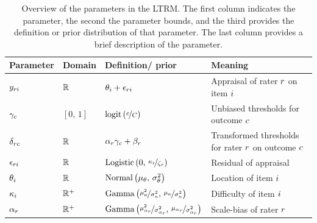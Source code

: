 \documentclass[a4paper,usenames,dvipsnames]{article}
\newenvironment{revision}{\color{teal}}{\color{black}}
\begin{document}
\begin{revision}

	\begin{table}[!ht]

	\centering
	\caption{\begin{revision}Overview of the parameters in the LTRM. The first column indicates the parameter, the second the parameter bounds, and the third provides the definition or prior distribution of that parameter. The last column provides a brief description of the parameter.\end{revision}}%

	\label{tb:LTRMparameterOverview}

	\begin{tabular}{llll}

	\toprule

	Parameter & Domain & Definition/ prior & Meaning\\

	\midrule

	$y_{ri}		$&$	\mathbb{R}			$&$\theta_i + \epsilon_{ri}$&
	\makecell[l]{Appraisal of rater $r$\\on item $i$}\\

	$\gamma_c 		$&$	[0,\,1]			$&$\logit{\nicefrac{\Incat}{\Tncat}}$&
	\makecell[l]{Unbiased thresholds for\\outcome $c$}\\

	$\delta_{rc} 	$&$	\mathbb{R}			$&$\alpha_r \gamma_c + \beta_r$&
	\makecell[l]{Transformed thresholds\\for rater $r$ on outcome $c$}\\

	$\epsilon_{ri}   		$&$	\mathbb{R}			$&$\text{Logistic}\left(0,\,\nicefrac{\kappa_i}{\zeta_r}\right) $&
	Residual of appraisal\\

	$\theta_i        		$&$	\mathbb{R}			$&$\text{Normal}\left(\mu_\theta,\,\sigma_\theta^2\right)$&
	Location of item $i$\\

	$\kappa_i   		$&$	\mathbb{R}^+	$&$\text{Gamma}\left(\nicefrac{\mu_\kappa^2}{\sigma_\kappa^2},\,\nicefrac{\mu_\kappa}{\sigma_\kappa^2}\right) $&
	Difficulty of item $i$\\

	$\alpha_r      		$&$	\mathbb{R}^+	$&$\text{Gamma}\left(\nicefrac{\mu_{\alpha_r}^2}{\sigma_{\alpha_r}^2},\,\nicefrac{\mu_{\alpha_r}}{\sigma_{\alpha_r}^2}\right) $&
	Scale-bias of rater $r$\\


\end{tabular}
\end{table}
\end{revision}
\end{document}
